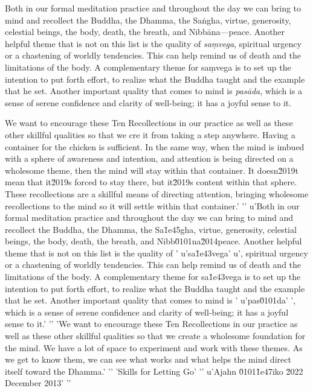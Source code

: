 Both in our formal meditation practice and throughout the day we can 
bring to mind and recollect the Buddha, the Dhamma, the Saṅgha, 
virtue, generosity, celestial beings, the body, death, the breath, and 
Nibbāna---peace. Another helpful theme that is not on this list is the 
quality of \emph{saṃvega}, spiritual urgency or a chastening of 
worldly tendencies. This can help remind us of death and the 
limitations of the body. A complementary theme for saṃvega is to set 
up the intention to put forth effort, to realize what the Buddha taught 
and the example that he set. Another important quality that comes to 
mind is \emph{pasāda}, which is a sense of serene confidence and 
clarity of well-being; it has a joyful sense to it.

We want to encourage these Ten Recollections in our practice as well as 
these other skillful qualities so that we cre it from taking a step anywhere. Having a container for the chicken is sufficient. In the same way, when the mind is imbued with a sphere of awareness and intention, and attention is being directed on a wholesome theme, then the mind will stay within that container. It doesn\u2019t mean that it\u2019s forced to stay there, but it\u2019s content within that sphere. These recollections are a skillful means of directing attention, bringing wholesome recollections to the mind so it will settle within that container.'
'\n'
u'Both in our formal meditation practice and throughout the day we can bring to mind and recollect the Buddha, the Dhamma, the Sa\u1e45gha, virtue, generosity, celestial beings, the body, death, the breath, and Nibb\u0101na\u2014peace. Another helpful theme that is not on this list is the quality of '
u'sa\u1e43vega'
u', spiritual urgency or a chastening of worldly tendencies. This can help remind us of death and the limitations of the body. A complementary theme for sa\u1e43vega is to set up the intention to put forth effort, to realize what the Buddha taught and the example that he set. Another important quality that comes to mind is '
u'pas\u0101da'
', which is a sense of serene confidence and clarity of well-being; it has a joyful sense to it.'
'\n'
'We want to encourage these Ten Recollections in our practice as well as these other skillful qualities so that we create a wholesome foundation for the mind. We have a lot of space to experiment and work with these themes. As we get to know them, we can see what works and what helps the mind direct itself toward the Dhamma.'
'\n'
'Skills for Letting Go'
'\n'
u'Ajahn \u0101\u1e47iko \u2022 December 2013'
'\n'
